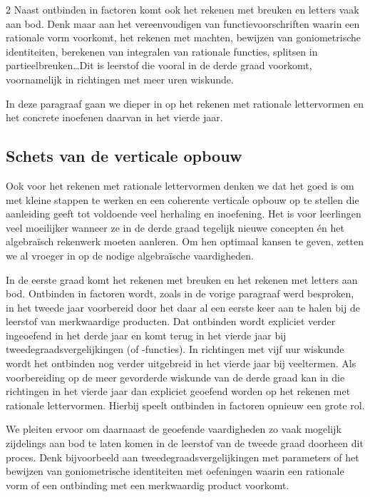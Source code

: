 \begin{multicols}{2}
Naast ontbinden in factoren komt ook het rekenen met breuken en letters vaak aan bod. Denk maar aan het vereenvoudigen van functievoorschriften waarin een rationale vorm voorkomt, het rekenen met machten, bewijzen van goniometrische identiteiten, berekenen van integralen van rationale functies, splitsen in partieelbreuken\ldots Dit is leerstof die vooral in de derde graad voorkomt, voornamelijk in richtingen met meer uren wiskunde. 

In deze paragraaf gaan we dieper in op het rekenen met rationale lettervormen en het concrete inoefenen daarvan in het vierde jaar.




\subsection{Schets van de verticale opbouw}
Ook voor het rekenen met rationale lettervormen denken we dat het goed is om met kleine stappen te werken en een coherente verticale opbouw op te stellen die aanleiding geeft tot voldoende veel herhaling en inoefening. Het is voor leerlingen veel moeilijker wanneer ze in de derde graad tegelijk nieuwe concepten én het algebraïsch rekenwerk moeten aanleren. Om hen optimaal kansen te geven, zetten we al vroeger in op de nodige algebraïsche vaardigheden.

In de eerste graad komt het rekenen met breuken en het rekenen met letters aan bod. Ontbinden in factoren wordt, zoals in de vorige paragraaf werd besproken, in het tweede jaar voorbereid door het daar al een eerste keer aan te halen bij de leerstof van merkwaardige producten. Dat ontbinden wordt expliciet verder ingeoefend in het derde jaar en komt terug in het vierde jaar bij tweedegraadsvergelijkingen (of -functies). In richtingen met vijf uur wiskunde wordt het ontbinden nog verder uitgebreid in het vierde jaar bij veeltermen. Als voorbereiding op de meer gevorderde wiskunde van de derde graad kan in die richtingen in het vierde jaar dan expliciet geoefend worden op het rekenen met rationale lettervormen. Hierbij speelt ontbinden in factoren opnieuw een grote rol. 

We pleiten ervoor om daarnaast de geoefende vaardigheden zo vaak mogelijk zijdelings aan bod te laten komen in de leerstof van de tweede graad doorheen dit proces. Denk bijvoorbeeld aan tweedegraadsvergelijkingen met parameters of het bewijzen van goniometrische identiteiten met oefeningen waarin een rationale vorm of een ontbinding met een merkwaardig product voorkomt. 


\end{multicols}
